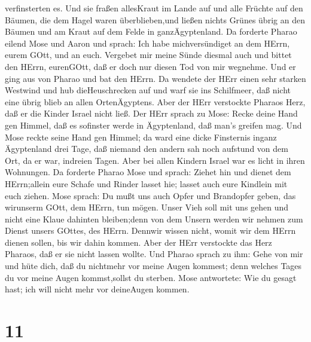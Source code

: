 verfinsterten es. Und sie fraßen allesKraut im Lande auf und alle
Früchte auf den Bäumen, die dem Hagel waren überblieben,und ließen
nichts Grünes übrig an den Bäumen und am Kraut auf dem Felde in
ganzÄgyptenland.  Da forderte Pharao eilend Mose und Aaron
und sprach: Ich habe michversündiget an dem HErrn, eurem GOtt, und an
euch.  Vergebet mir meine Sünde diesmal auch und bittet den
HErrn, eurenGOtt, daß er doch nur diesen Tod von mir wegnehme.
 Und er ging aus von Pharao und bat den HErrn.
 Da wendete der HErr einen sehr starken Westwind und hub
dieHeuschrecken auf und warf sie ins Schilfmeer, daß nicht eine übrig
blieb an allen OrtenÄgyptens.  Aber der HErr verstockte
Pharaos Herz, daß er die Kinder Israel nicht ließ.  Der
HErr sprach zu Mose: Recke deine Hand gen Himmel, daß es sofinster werde
in Ägyptenland, daß man's greifen mag.  Und Mose reckte
seine Hand gen Himmel; da ward eine dicke Finsternis inganz Ägyptenland
drei Tage,  daß niemand den andern sah noch aufstund von
dem Ort, da er war, indreien Tagen. Aber bei allen Kindern Israel war es
licht in ihren Wohnungen.  Da forderte Pharao Mose und
sprach: Ziehet hin und dienet dem HErrn;allein eure Schafe und Rinder
lasset hie; lasset auch eure Kindlein mit euch ziehen. 
Mose sprach: Du mußt uns auch Opfer und Brandopfer geben, das wirunserm
GOtt, dem HErrn, tun mögen.  Unser Vieh soll mit uns gehen
und nicht eine Klaue dahinten bleiben;denn von dem Unsern werden wir
nehmen zum Dienst unsers GOttes, des HErrn. Dennwir wissen nicht, womit
wir dem HErrn dienen sollen, bis wir dahin kommen.  Aber
der HErr verstockte das Herz Pharaos, daß er sie nicht lassen wollte.
 Und Pharao sprach zu ihm: Gehe von mir und hüte dich, daß
du nichtmehr vor meine Augen kommest; denn welches Tages du vor meine
Augen kommst,sollst du sterben.  Mose antwortete: Wie du
gesagt hast; ich will nicht mehr vor deineAugen kommen.

\hypertarget{section-10}{%
\section{11}\label{section-10}}

